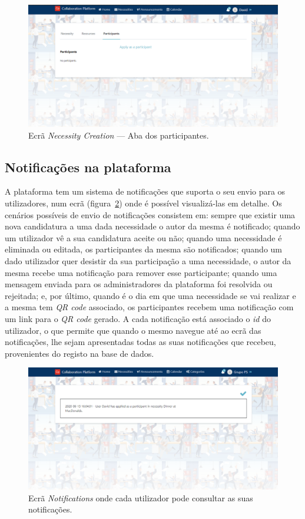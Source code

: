 \begin{figure}[H]
  \centering 
  \includegraphics[scale=0.4]{figures/Participants.png}
  \caption{Ecrã \textit{Necessity Creation} --- Aba dos participantes.}\label{fig:participants}
\end{figure}

\subsection{Notificações na plataforma}\label{subsec:implementacao:notificacoes}

A plataforma tem um sistema de notificações que suporta o seu envio para os utilizadores, num ecrã (figura~\ref{fig:notifications}) onde é possível visualizá-las em detalhe. 
Os cenários possíveis de envio de notificações consistem em: sempre que existir uma nova candidatura a uma dada necessidade o autor da mesma é notificado; 
quando um utilizador vê a sua candidatura aceite ou não; 
quando uma necessidade é eliminada ou editada, os participantes da mesma são notificados;
quando um dado utilizador quer desistir da sua participação a uma necessidade, o autor da mesma recebe uma notificação para remover esse participante;
quando uma mensagem enviada para os administradores da plataforma foi resolvida ou rejeitada;
e, por último, quando é o dia em que uma necessidade se vai realizar e a mesma tem \textit{QR code} associado, os participantes recebem uma notificação com um link para o \textit{QR code} gerado.
A cada notificação está associado o \textit{id} do utilizador, o que permite que quando o mesmo navegue até ao ecrã das notificações, 
lhe sejam apresentadas todas as suas notificações que recebeu, provenientes do registo na base de dados.

\begin{figure}[H]
  \centering 
  \includegraphics[scale=0.4]{figures/Notifications.png}
  \caption{Ecrã \textit{Notifications} onde cada utilizador pode consultar as suas notificações.}\label{fig:notifications}
\end{figure}